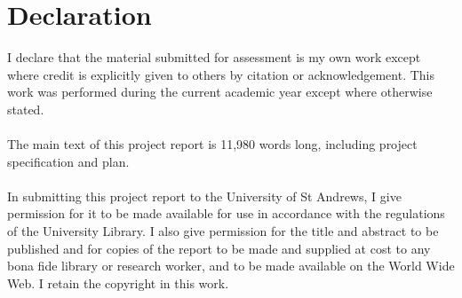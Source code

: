 \documentclass[a4paper]{article}
\begin{document}
\section*{Declaration}
I declare that the material submitted for assessment is my own work except where credit is explicitly given to others by citation or acknowledgement. This work was performed during the current academic year except where otherwise stated. \\\\
The main text of this project report is 11,980 words long, including project specification and plan.\\\\
In submitting this project report to the University of St Andrews, I give permission for it to be made available for use in accordance with the regulations of the University Library. I also give permission for the title and abstract to be published and for copies of the report to be made and supplied at cost to any bona fide library or research worker, and to be made available on the World Wide Web. I retain the copyright in this work.\pagebreak
\tableofcontents













\end{document}
